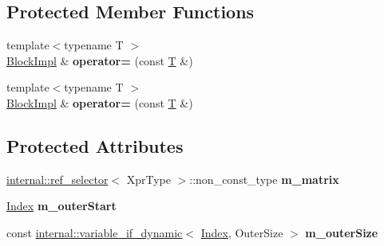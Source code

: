 \subsection*{Protected Member Functions}
\begin{DoxyCompactItemize}
\item 
\mbox{\label{class_eigen_1_1_block_impl_3_01_xpr_type_00_01_block_rows_00_01_block_cols_00_01true_00_01_sparse_01_4_ac99a8afd4c9ac1c54c9e043ec8acc7a9}} 
{\footnotesize template$<$typename T $>$ }\\\hyperlink{class_eigen_1_1_block_impl}{Block\+Impl} \& {\bfseries operator=} (const \hyperlink{group___sparse_core___module}{T} \&)
\item 
\mbox{\label{class_eigen_1_1_block_impl_3_01_xpr_type_00_01_block_rows_00_01_block_cols_00_01true_00_01_sparse_01_4_ac99a8afd4c9ac1c54c9e043ec8acc7a9}} 
{\footnotesize template$<$typename T $>$ }\\\hyperlink{class_eigen_1_1_block_impl}{Block\+Impl} \& {\bfseries operator=} (const \hyperlink{group___sparse_core___module}{T} \&)
\end{DoxyCompactItemize}
\subsection*{Protected Attributes}
\begin{DoxyCompactItemize}
\item 
\mbox{\label{class_eigen_1_1_block_impl_3_01_xpr_type_00_01_block_rows_00_01_block_cols_00_01true_00_01_sparse_01_4_a48d5ade292bba81825106dc56f2c7169}} 
\hyperlink{struct_eigen_1_1internal_1_1ref__selector}{internal\+::ref\+\_\+selector}$<$ Xpr\+Type $>$\+::non\+\_\+const\+\_\+type {\bfseries m\+\_\+matrix}
\item 
\mbox{\label{class_eigen_1_1_block_impl_3_01_xpr_type_00_01_block_rows_00_01_block_cols_00_01true_00_01_sparse_01_4_a3938dc4edb0eba663df891828d5fe30d}} 
\hyperlink{group___core___module_a554f30542cc2316add4b1ea0a492ff02}{Index} {\bfseries m\+\_\+outer\+Start}
\item 
\mbox{\label{class_eigen_1_1_block_impl_3_01_xpr_type_00_01_block_rows_00_01_block_cols_00_01true_00_01_sparse_01_4_a72bdbc23418735a6d251ee85f1313033}} 
const \hyperlink{class_eigen_1_1internal_1_1variable__if__dynamic}{internal\+::variable\+\_\+if\+\_\+dynamic}$<$ \hyperlink{group___core___module_a554f30542cc2316add4b1ea0a492ff02}{Index}, Outer\+Size $>$ {\bfseries m\+\_\+outer\+Size}
\end{DoxyCompactItemize}
